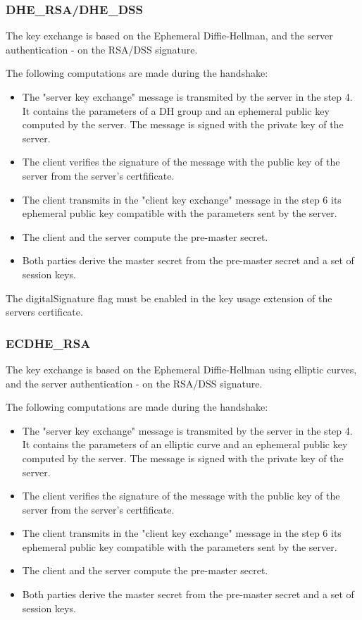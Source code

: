 \subsubsection*{DHE\_RSA/DHE\_DSS}
The key exchange is based on the Ephemeral Diffie-Hellman, and the server authentication - on the RSA/DSS signature.

The following computations are made during the handshake:
\begin{itemize}
	\item The "server key exchange" message is transmited by the server in the step 4. It contains the parameters of a DH group and an ephemeral public key computed by the server. The message is signed with the private key of the server.
	\item The client verifies the signature of the message with the public key of the server from the server's certfificate.
	\item The client transmits in the "client key exchange" message in the step 6 its ephemeral public key compatible with the parameters sent by the server.
	\item The client and the server compute the pre-master secret.
	\item Both parties derive the master secret from the pre-master secret and a set of session keys.
\end{itemize}

The digitalSignature flag must be enabled in the key usage extension of the servers certificate.

\subsubsection*{ECDHE\_RSA}
The key exchange is based on the Ephemeral Diffie-Hellman using elliptic curves, and the server authentication - on the RSA/DSS signature.

The following computations are made during the handshake:
\begin{itemize}
	\item The "server key exchange" message is transmited by the server in the step 4. It contains the parameters of an elliptic curve and an ephemeral public key computed by the server. The message is signed with the private key of the server.
	\item The client verifies the signature of the message with the public key of the server from the server's certfificate.
	\item The client transmits in the "client key exchange" message in the step 6 its ephemeral public key compatible with the parameters sent by the server.
	\item The client and the server compute the pre-master secret.
	\item Both parties derive the master secret from the pre-master secret and a set of session keys.
\end{itemize}

